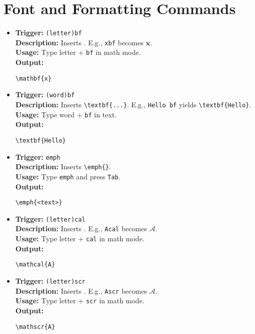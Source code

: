 \documentclass{article}
\begin{document}
\section{Font and Formatting Commands}
\begin{itemize}[leftmargin=*, label={}]
\item \textbf{Trigger:} \texttt{(letter)bf} \\
\textbf{Description:} Inserts \(\mathbf{}\). E.g., \texttt{xbf} becomes \(\mathbf{x}\). \\
\textbf{Usage:} Type letter + \texttt{bf} in math mode. \\
\textbf{Output:}
\begin{verbatim}
\mathbf{x}
\end{verbatim}

\item \textbf{Trigger:} \texttt{(word)bf} \\
\textbf{Description:} Inserts \verb|\textbf{...}|. E.g., \texttt{Hello bf} yields \verb|\textbf{Hello}|. \\
\textbf{Usage:} Type word + \texttt{bf} in text. \\
\textbf{Output:}
\begin{verbatim}
\textbf{Hello}
\end{verbatim}

\item \textbf{Trigger:} \texttt{emph} \\
\textbf{Description:} Inserts \verb|\emph{}|. \\
\textbf{Usage:} Type \texttt{emph} and press \texttt{Tab}. \\
\textbf{Output:}
\begin{verbatim}
\emph{<text>}
\end{verbatim}

\item \textbf{Trigger:} \texttt{(letter)cal} \\
\textbf{Description:} Inserts \(\mathcal{}\). E.g., \texttt{Acal} becomes \(\mathcal{A}\). \\
\textbf{Usage:} Type letter + \texttt{cal} in math mode. \\
\textbf{Output:}
\begin{verbatim}
\mathcal{A}
\end{verbatim}

\item \textbf{Trigger:} \texttt{(letter)scr} \\
\textbf{Description:} Inserts \(\mathscr{}\). E.g., \texttt{Ascr} becomes \(\mathscr{A}\). \\
\textbf{Usage:} Type letter + \texttt{scr} in math mode. \\
\textbf{Output:}
\begin{verbatim}
\mathscr{A}
\end{verbatim}


\end{itemize}
\end{document}
